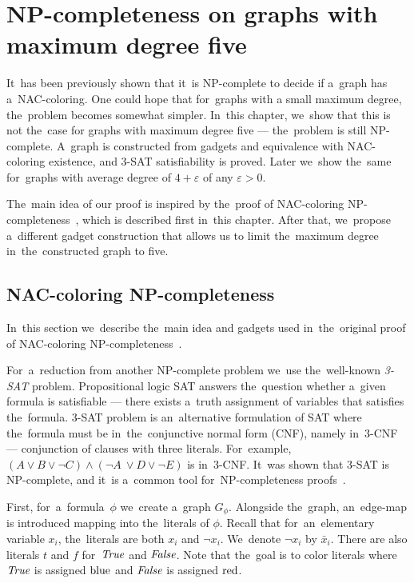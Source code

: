 \chapter{NP-completeness on graphs with maximum degree five}%
\label{chapter:np}

\begin{chapterabstract}

	It~has been previously shown that it~is NP-complete to decide
	if a~graph has a~NAC-coloring.
	One could hope that for~graphs with a small maximum degree,
	the~problem becomes somewhat simpler.
	In~this chapter, we~show that this is not the~case
	for graphs with maximum degree five --- the~problem is still NP-complete.
	A~graph is constructed from gadgets and equivalence
	with NAC-coloring existence, and 3-SAT satisfiability is proved.
	Later we~show the~same for~graphs with average degree of
	$4+\varepsilon$ of any $\varepsilon > 0$.

\end{chapterabstract}

The~main idea of our proof is inspired by
the~proof of NAC-coloring NP-completeness~\cite{np_complete},
which is described first in~this chapter.
After that, we~propose a~different gadget construction
that allows us to limit the~maximum
degree in~the~constructed graph to five.

\section{NAC-coloring NP-completeness}

In~this section we~describe the~main idea and gadgets used
in~the~original proof of NAC-coloring NP-completeness~\cite{np_complete}.

For~a~reduction from another NP-complete problem
we~use the~well-known \emph{3-SAT} problem.
Propositional logic SAT answers the~question
whether a~given formula is satisfiable ---
there exists a~truth assignment of variables that satisfies the~formula.
3-SAT problem is an~alternative formulation of SAT
where the~formula must be in~the~conjunctive normal form (CNF), namely in~3-CNF
--- conjunction of clauses with three literals.
For~example, \( (A \lor B \lor \lnot C) \land (\lnot A~\lor D \lor \lnot E) \)
is in~3-CNF\@.
It~was shown that 3-SAT is NP-complete,
and it~is a~common tool for~NP-completeness proofs~\cite{3-sat}.

First, for~a~formula~\( \phi \) we~create a~graph \( G_\phi \).
Alongside the~graph, an~edge-map is introduced mapping into the~literals
of \( \phi \). Recall that for~an~elementary variable \( x_i \), the~literals
are both \( x_i \) and \( \neg x_i \). We~denote \( \lnot x_i \) by \( \bar{x}_i \).
There are also literals \( t \) and \( f \) for~\( \textit{True} \) and \( \textit{False} \).
Note that the~goal is to color literals where \( \textit{True} \) is assigned \( \text{blue} \)
and \( \textit{False} \) is assigned \( \text{red} \).

